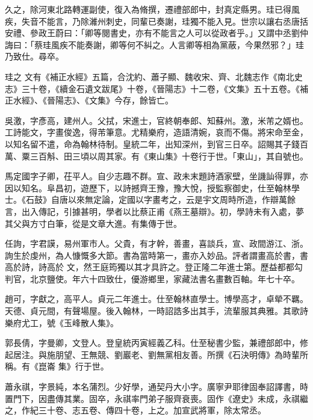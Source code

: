 \begin{pinyinscope}
 久之，除河東北路轉運副使，復入為脩撰，遷禮部郎中，封真定縣男。珪已得風疾，失音不能言，乃除濰州刺史，同輩已奏謝，珪獨不能入見。世宗以讓右丞唐括安禮、參政王蔚曰：「卿等閱書史，亦有不能言之人可以從政者乎。」又謂中丞劉仲誨曰：「蔡珪風疾不能奏謝，卿等何不糾之。人言卿等相為黨蔽，今果然邪？」珪乃致仕。尋卒。



 珪之
 文有《補正水經》五篇，合沈約、蕭子顯、魏收宋、齊、北魏志作《南北史志》三十卷，《續金石遺文跋尾》十卷，《晉陽志》十二卷，《文集》五十五卷。《補正水經》、《晉陽志》、《文集》今存，餘皆亡。



 吳激，字彥高，建州人。父拭，宋進士，官終朝奉郎、知蘇州。激，米芾之婿也。工詩能文，字畫俊逸，得芾筆意。尤精樂府，造語清婉，哀而不傷。將宋命至金，以知名留不遣，命為翰林待制。皇統二年，出知深州，到官三日卒。詔賜其子錢百萬、粟三百斛、田三頃以周其家。有《東山集》十卷行于世。「東山」，其自號也。



 馬定國字子卿，茌平人。自少志趣不群。宣、政未末題詩酒家壁，坐譏訕得罪，亦因以知名。阜昌初，遊歷下，以詩撼齊王豫，豫大悅，授監察御史，仕至翰林學士。《石鼓》自唐以來無定論，定國以字畫考之，云是宇文周時所造，作辯萬餘言，出入傳記，引據甚明，學者以比蔡正甫《燕王墓辯》。初，學詩未有入處，夢其父與方寸白筆，從是文章大進。有集傳于世。



 任詢，字君謨，易州軍市人。父貴，有才幹，善畫，喜談兵，宣、政間游江、浙。詢生於虔州，為人慷慨多大節。書為當時第一，畫亦入妙品。評者謂畫高於書，書高於詩，詩高於
 文，然王庭筠獨以其才具許之。登正隆二年進士第。歷益都都勾判官，北京鹽使。年六十四致仕，優游鄉里，家藏法書名畫數百軸。年七十卒。



 趙可，字獻之，高平人。貞元二年進士。仕至翰林直學士。博學高才，卓犖不羈。天德、貞元間，有聲場屋。後入翰林，一時詔誥多出其手，流輩服其典雅。其歌詩樂府尤工，號《玉峰散人集》。



 郭長倩，字曼卿，文登人。登皇統丙寅經義乙科。仕至秘書少監，兼禮部郎中，修起居注。與施朋望、王無競、劉巖老、劉無黨相友善。所撰《石決明傳》為時輩所稱。有《崑崙
 集》行于世。



 蕭永祺，字景純，本名蒲烈。少好學，通契丹大小字。廣寧尹耶律固奉詔譯書，時置門下，因盡傳其業。固卒，永祺率門弟子服齊衰喪。固作《遼史》未成，永祺繼之，作紀三十卷、志五卷、傳四十卷，上之。加宣武將軍，除太常丞。




\end{pinyinscope}
